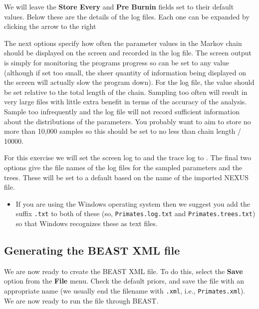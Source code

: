 \documentclass[11pt]{article}
\theoremstyle{plain}%
\theoremstyle{definition}
\theoremstyle{remark}
\begin{document}

We will leave the \textbf{Store Every}  and \textbf{Pre Burnin} fields set to their default values. Below these are the details of the log files. Each one can be expanded by clicking the arrow to the right

The next options specify how often the parameter values in the Markov
chain should be displayed on the screen and recorded in the log file.
The screen output is simply for monitoring the programs progress so
can be set to any value (although if set too small, the sheer quantity
of information being displayed on the screen will actually slow the
program down). For the log file, the value should be set relative
to the total length of the chain. Sampling too often will result in
very large files with little extra benefit in terms of the accuracy
of the analysis. Sample too infrequently and the log file will not
record sufficient information about the distributions of the parameters. 
You probably want to aim to store no more than 10,000 samples so this should be
set to no less than chain length / 10000.

For this exercise we will set the screen log to \screenEvery{} and the trace log to \logEvery{}. The final two
options give the file names of the log files for the sampled parameters and
the trees. These will be set to a default based on the name of the
imported NEXUS file. 

\begin{itemize}
\item If you are using the Windows operating system then we suggest you add the suffix \texttt{.txt} to both of these (so,
\texttt{Primates.log.txt} and \texttt{Primates.trees.txt}) so that Windows recognizes
these as text files. 
\end{itemize}

\subsection{Generating the BEAST XML file }

We are now ready to create the BEAST XML file. To do this,
select the \textbf{Save} option from the \textbf{File} menu. 
Check the default priors, and save the file with an appropriate name
(we usually end the filename with \texttt{.xml}, i.e., \texttt{Primates.xml}).
We are now ready to run the file through BEAST. 
\end{document}
